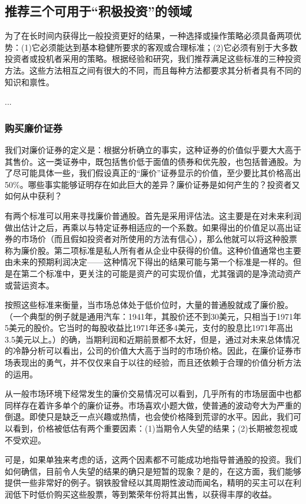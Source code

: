 \documentclass[12pt,oneside]{book}
\begin{document}
\subsection{推荐三个可用于“积极投资”的领域}
为了在长时间内获得比一般投资更好的结果，一种选择或操作策略必须具备两项优势：(1)它必须能达到基本稳健所要求的客观或合理标准；(2)它必须有别于大多数投资者或投机者采用的策略。根据经验和研究，我们推荐满足这些标准的三种投资方法。这些方法相互之间有很大的不同，而且每种方法都要求其分析者具有不同的知识和禀性。

...

\subsubsection{购买廉价证券}
我们对廉价证券的定义是：根据分析确立的事实，这种证券的价值似乎要大大高于其售价。这一类证券中，既包括售价低于面值的债券和优先股，也包括普通股。为了尽可能具体一些，我们假设真正的“廉价”证券显示的价值，至少要比其价格高出50\%。哪些事实能够证明存在如此巨大的差异？廉价证券是如何产生的？投资者又如何从中获利？

有两个标准可以用来寻找廉价普通股。首先是采用评估法。这主要是在对未来利润做出估计之后，再乘以与特定证券相适应的一个系数。如果得出的价值足以高出证券的市场价（而且假如投资者对所使用的方法有信心），那么他就可以将这种股票称为廉价股。第二项标准是私人所有者从企业中获得的价值。这种价值通常也主要由未来的预期利润决定——这种情况下得出的结果可能与第一个标准是一样的。但是在第二个标准中，更关注的可能是资产的可实现价值，尤其强调的是净流动资产或营运资本。

按照这些标准来衡量，当市场总体处于低价位时，大量的普通股就成了廉价股。（一个典型的例子就是通用汽车：1941年，其股价还不到30美元，只相当于1971年5美元的股价。它当时的每股收益比1971年还多4美元，支付的股息比1971年高出3.5美元以上。）的确，当期利润和近期前景都不太好，但是，通过对未来总体情况的冷静分析可以看出，公司的价值大大高于当时的市场价格。因此，在廉价证券市场表现出的勇气，并不仅仅来自于以往的经验，而且还依赖于合理的价值分析方法的运用。

从一般市场环境下经常发生的廉价交易情况可以看到，几乎所有的市场层面中也都同样存在着许多单个的廉价证券。市场喜欢小题大做，使普通的波动夸大为严重的倒退。即使只是缺乏一点兴趣或热情，也会使价格降到荒谬的水平。因此，我们可以看到，价格被低估有两个重要因素：(1)当期令人失望的结果；(2)长期被忽视或不受欢迎。

可是，如果单独来考虑的话，这两个因素都不可能成功地指导普通股的投资。我们如何确信，目前令人失望的结果的确只是短暂的现象？是的，在这方面，我们能够提供一些非常好的例子。钢铁股曾经以其周期性波动而闻名，精明的买主可以在利润低下时低价购买这些股票，等到繁荣年份将其出售，以获得丰厚的收益。
\end{document}
